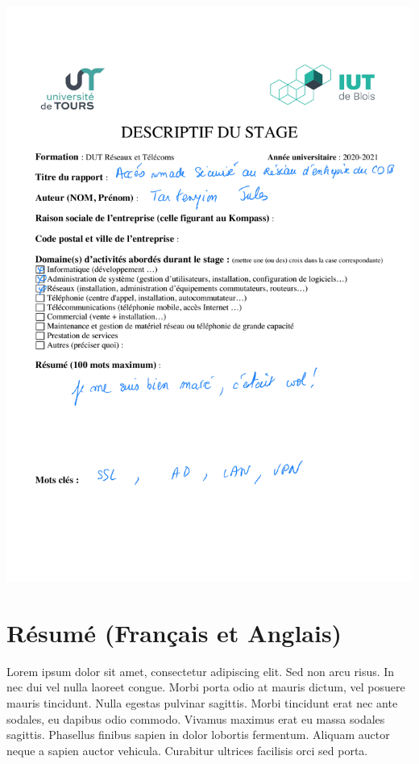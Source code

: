 \documentclass[a4paper,12pt]{report}
\begin{document}
\newpage
\includegraphics[width=7in]{image/images/bu} 
\newpage

\tableofcontents

\chapter{Résumé (Français et Anglais)} %
Lorem ipsum dolor sit amet, consectetur adipiscing elit. Sed non arcu risus. In nec dui vel nulla laoreet congue. Morbi porta odio at mauris dictum, vel posuere mauris tincidunt. Nulla egestas pulvinar sagittis. Morbi tincidunt erat nec ante sodales, eu dapibus odio commodo. Vivamus maximus erat eu massa sodales sagittis. Phasellus finibus sapien in dolor lobortis fermentum. Aliquam auctor neque a sapien auctor vehicula. Curabitur ultrices facilisis orci sed porta.
\end{document}
